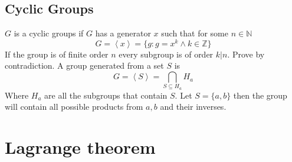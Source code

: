 \documentclass{article}
\newcommand{\N}{\mathbb{N}}
\newcommand{\Z}{\mathbb{Z}}
\begin{document}
	\subsection{Cyclic Groups}
	$G$ is a cyclic groups if $G$ has a generator $x$ such that for some $n\in\N$
	\[	G=\left<x\right>=\{g:g=x^k \land k\in\Z\}
	\]
	If the group is of finite order $n$ every subgroup is of order $k|n$. Prove by contradiction. A group generated from a set $S$ is
	\[	G=\left<S\right>=\bigcap_{S\subseteq H_a}{H_a}
	\]
	Where $H_a$ are all the subgroups that contain $S$. Let $S = \{a,b\}$ then the group will contain all possible products from $a,b$ and their inverses.
	
	\newpage
	\section{Lagrange theorem}
	
\end{document}
